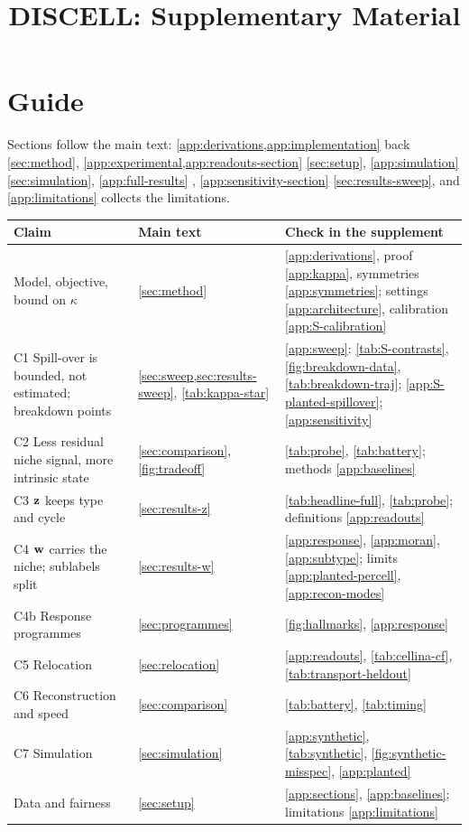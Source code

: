 \documentclass[letterpaper,10pt]{article}
\title{DISCELL: Supplementary Material}
\author{}
\date{}
\begin{document}
\maketitle

\section*{Guide}
Sections follow the main text: \cref{app:derivations,app:implementation} back \cref{sec:method}, \cref{app:experimental,app:readouts-section} \cref{sec:setup}, \cref{app:simulation} \cref{sec:simulation}, \cref{app:full-results} , \cref{app:sensitivity-section} \cref{sec:results-sweep}, and \cref{app:limitations} collects the limitations.

\begin{center}
\footnotesize
\setlength{\tabcolsep}{4pt}
\begin{tabular}{@{}p{}p{}p{}@{}}
\toprule
Claim & Main text & Check in the supplement \\
\midrule
Model, objective, bound on $\kappa$ & \cref{sec:method} & \cref{app:derivations}, proof \cref{app:kappa}, symmetries \cref{app:symmetries}; settings \cref{app:architecture}, calibration \cref{app:S-calibration} \\
C1 Spill-over is bounded, not estimated; breakdown points & \cref{sec:sweep,sec:results-sweep}, \cref{tab:kappa-star} & \cref{app:sweep}: \cref{tab:S-contrasts}, \cref{fig:breakdown-data}, \cref{tab:breakdown-traj}; \cref{app:S-planted-spillover}; \cref{app:sensitivity} \\
C2 Less residual niche signal, more intrinsic state & \cref{sec:comparison}, \cref{fig:tradeoff} & \cref{tab:probe}, \cref{tab:battery}; methods \cref{app:baselines} \\
C3 $\mathbf{z}$ keeps type and cycle & \cref{sec:results-z} & \cref{tab:headline-full}, \cref{tab:probe}; definitions \cref{app:readouts} \\
C4 $\mathbf{w}$ carries the niche; sublabels split & \cref{sec:results-w} & \cref{app:response}, \cref{app:moran}, \cref{app:subtype}; limits \cref{app:planted-percell}, \cref{app:recon-modes} \\
C4b Response programmes & \cref{sec:programmes} & \cref{fig:hallmarks}, \cref{app:response} \\
C5 Relocation & \cref{sec:relocation} & \cref{app:readouts}, \cref{tab:cellina-cf}, \cref{tab:transport-heldout} \\
C6 Reconstruction and speed & \cref{sec:comparison} & \cref{tab:battery}, \cref{tab:timing} \\
C7 Simulation & \cref{sec:simulation} & \cref{app:synthetic}, \cref{tab:synthetic}, \cref{fig:synthetic-misspec}, \cref{app:planted} \\
Data and fairness & \cref{sec:setup} & \cref{app:sections}, \cref{app:baselines}; limitations \cref{app:limitations} \\
\bottomrule
\end{tabular}
\end{center}
\end{document}
